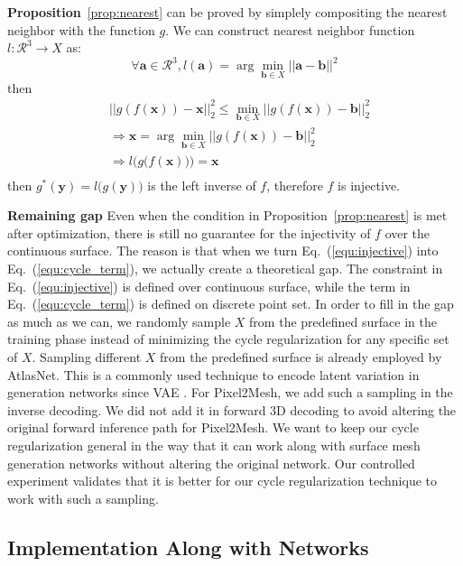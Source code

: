 \textbf{Proposition}~\ref{prop:nearest} can be proved by simplely compositing the nearest neighbor with the function $g$. We can construct nearest neighbor function $l: \mathcal{R}^3 \rightarrow X $ as:
\begin{equation}
\forall \mathbf{a} \in \mathcal{R}^3, l(\mathbf{a}) = \arg\min_{\mathbf{b} \in X} || \mathbf{a} - \mathbf{b} ||^2
\end{equation}
then
\begin{equation}
\begin{aligned}
&|| g(f(\mathbf{x})) - \mathbf{x} ||_2^2 \leq \min_{\mathbf{b} \in X}|| g(f(\mathbf{x})) - \mathbf{b} ||_2^2\\
&\Rightarrow \mathbf{x} = \arg\min_{\mathbf{b} \in X}|| g(f(\mathbf{x})) - \mathbf{b} ||_2^2\\
&\Rightarrow l\Big(g\big(f(\mathbf{x})\big)\Big) = \mathbf{x}\\
\end{aligned}
\end{equation}
then $g^*(\mathbf{y}) = l\big(g(\mathbf{y})\big)$ is the left inverse of $f$, therefore $f$ is injective.

\noindent\textbf{Remaining gap}
Even when the condition in Proposition~\ref{prop:nearest} is met after optimization, there is still no guarantee for the injectivity of $f$ over the continuous surface. The reason is that when we turn Eq.~(\ref{equ:injective}) into Eq.~(\ref{equ:cycle_term}), we actually create a theoretical gap. 
The constraint in Eq.~(\ref{equ:injective}) is defined over continuous surface, while the term in  Eq.~(\ref{equ:cycle_term}) is defined on discrete point set. In order to fill in the gap as much as we can, we randomly sample $X$ from the predefined surface in the training phase instead of minimizing the cycle regularization for any specific set of $X$. Sampling different $X$ from the predefined surface is already employed by AtlasNet. This is a commonly used technique to encode latent variation in generation networks since VAE \cite{VAE}. For Pixel2Mesh, we add such a sampling in the inverse decoding. We did not add it in forward 3D decoding to avoid altering the original forward inference path for Pixel2Mesh. We want to keep our cycle regularization general in the way that it can work along with surface mesh generation networks without altering the original network. Our controlled experiment validates that it is better for our cycle regularization technique to work with such a sampling.

\subsection{Implementation Along with Networks}

